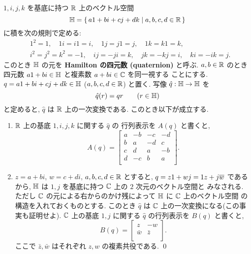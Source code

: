 \documentclass[12pt,twoside]{jarticle}
\begin{document}
\begin{question}
  $1,i,j,k$ を基底に持つ ${\mathbb R}$ 上のベクトル空間
  \begin{equation*}
    {\mathbb H} = \{\, a1 + bi + cj + dk \mid a,b,c,d\in{\mathbb R} \,\}
  \end{equation*}
  に積を次の規則で定める:
  \begin{align*}
    &
    1^2=1, \quad
    1i=i1=i, \quad 1j=j1=j, \quad 1k=k1=k, \quad 
    \\ &
    i^2=j^2=k^2=-1, \quad
    ij=-ji=k, \quad jk=-kj=i, \quad ki=-ik=j.
  \end{align*}
  このとき ${\mathbb H}$ の元を {\bf Hamilton の四元数 (quaternion)} と呼ぶ.
  $a,b\in{\mathbb R}$ のとき四元数 $a1+bi\in{\mathbb H}$ と複素数 $a+bi\in{\mathbb C}$ を同一視する
  ことにする.
  $q = a1 + bi + cj + dk\in{\mathbb H}$ ($a,b,c,d\in{\mathbb R}$) と置く.
  写像 $\hat{q}:{\mathbb H}\to{\mathbb H}$ を
  \begin{equation*}
    \hat{q}(r) = qr \qquad (r\in{\mathbb H})
  \end{equation*}
  と定めると, $\hat{q}$ は ${\mathbb R}$ 上の一次変換である.  このとき以下が成立する.
  \begin{enumerate}
  \item ${\mathbb R}$ 上の基底 $1,i,j,k$ に関する $\hat{q}$ の
    行列表示を $A(q)$ と書くと,
    \begin{equation*}
      A(q) = 
      \left[
      \begin{array}{rrrr}
        a & -b & -c & -d \\
        b &  a & -d &  c \\
        c &  d &  a & -b \\
        d & -c &  b &  a \\
      \end{array}
      \right].
    \end{equation*}
  \item $z=a+bi$, $w=c+di$, $a,b,c,d\in{\mathbb R}$ とすると, $q=z1+wj=1z+j\overline{w}$ である
    から,  ${\mathbb H}$ は $1,j$ を基底に持つ ${\mathbb C}$ 上の $2$ 次元のベクトル空間と
    みなされる.  
    ただし ${\mathbb C}$ の元による右からのかけ残によって ${\mathbb H}$ に ${\mathbb C}$ 上のベクトル空間
    の構造を入れておくものとする.
    このとき $\hat{q}$ は ${\mathbb C}$ 上の一次変換になる(この事実も証明せよ).
    ${\mathbb C}$ 上の基底 $1,j$ に関する $\hat{q}$ の行列表示を $B(q)$ と書くと,
    \begin{equation*}
      B(q) = 
      \begin{bmatrix}
        z       & -w \\
        \bar{w} & \bar{z} \\
      \end{bmatrix}.
    \end{equation*}
    ここで $\bar{z},\bar{w}$ はそれぞれ $z,w$ の複素共役である. \qed
  \end{enumerate}
\end{question}
\end{document}
